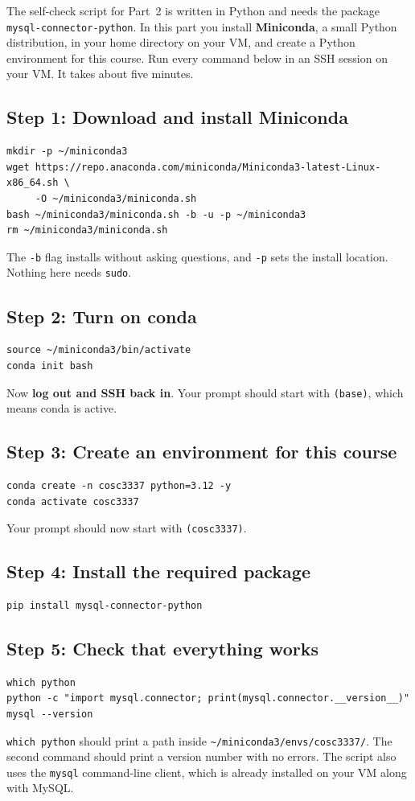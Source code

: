 \documentclass[11pt]{article}
\newcommand{\code}[1]{\texttt{#1}}
\begin{document}
The self-check script for Part~2 is written in Python and needs the package
\code{mysql-connector-python}. In this part you install \textbf{Miniconda}, a small Python
distribution, in your home directory on your VM, and create a Python environment for this course.
Run every command below in an SSH session on your VM. It takes about five minutes.


\subsection*{Step 1: Download and install Miniconda}
\begin{lstlisting}
mkdir -p ~/miniconda3
wget https://repo.anaconda.com/miniconda/Miniconda3-latest-Linux-x86_64.sh \
     -O ~/miniconda3/miniconda.sh
bash ~/miniconda3/miniconda.sh -b -u -p ~/miniconda3
rm ~/miniconda3/miniconda.sh
\end{lstlisting}
The \code{-b} flag installs without asking questions, and \code{-p} sets the install location.
Nothing here needs \code{sudo}.



\subsection*{Step 2: Turn on conda}
\begin{lstlisting}
source ~/miniconda3/bin/activate
conda init bash
\end{lstlisting}
Now \textbf{log out and SSH back in}. Your prompt should start with \code{(base)}, which means conda
is active.

\subsection*{Step 3: Create an environment for this course}
\begin{lstlisting}
conda create -n cosc3337 python=3.12 -y
conda activate cosc3337
\end{lstlisting}
Your prompt should now start with \code{(cosc3337)}.

\subsection*{Step 4: Install the required package}
\begin{lstlisting}
pip install mysql-connector-python
\end{lstlisting}

\subsection*{Step 5: Check that everything works}
\begin{lstlisting}
which python
python -c "import mysql.connector; print(mysql.connector.__version__)"
mysql --version
\end{lstlisting}
\code{which python} should print a path inside \code{\textasciitilde/miniconda3/envs/cosc3337/}.
The second command should print a version number with no errors. The script also uses the
\code{mysql} command-line client, which is already installed on your VM along with MySQL.
\end{document}
